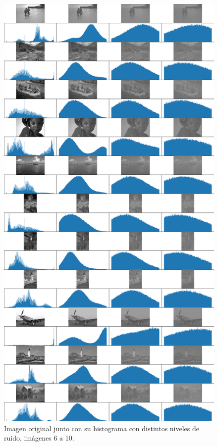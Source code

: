 \begin{figure}
    \centering
    \includegraphics[width=\textwidth]{figuras/img_hist_noise_2.png}
    \caption{Imagen original junto con su histograma con distintos niveles de ruido, im\'agenes 6 a 10.}
\end{figure}


